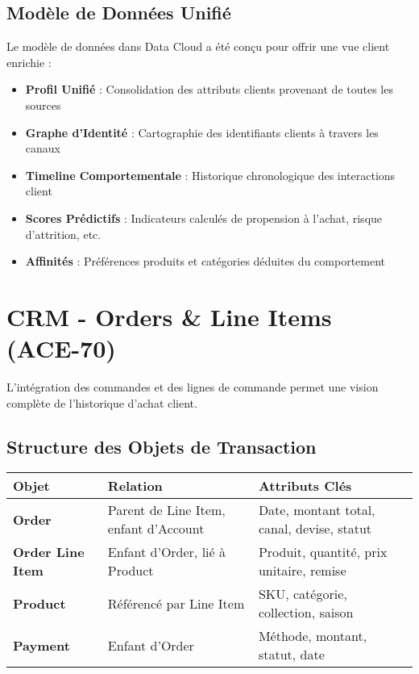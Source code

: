 \subsection{Modèle de Données Unifié}

Le modèle de données dans Data Cloud a été conçu pour offrir une vue client enrichie :

\begin{itemize}
    \item \textbf{Profil Unifié} : Consolidation des attributs clients provenant de toutes les sources
    \item \textbf{Graphe d'Identité} : Cartographie des identifiants clients à travers les canaux
    \item \textbf{Timeline Comportementale} : Historique chronologique des interactions client
    \item \textbf{Scores Prédictifs} : Indicateurs calculés de propension à l'achat, risque d'attrition, etc.
    \item \textbf{Affinités} : Préférences produits et catégories déduites du comportement
\end{itemize}

\section{CRM - Orders \& Line Items (ACE-70)}

L'intégration des commandes et des lignes de commande permet une vision complète de l'historique d'achat client.

\subsection{Structure des Objets de Transaction}

\begin{center}
\begin{tabular}{|>{\bfseries}p{3.5cm}|p{4cm}|p{6cm}|}
\hline
\rowcolor{lightblue} Objet & Relation & Attributs Clés \\
\hline
Order & Parent de Line Item, enfant d'Account & Date, montant total, canal, devise, statut \\
\hline
Order Line Item & Enfant d'Order, lié à Product & Produit, quantité, prix unitaire, remise \\
\hline
Product & Référencé par Line Item & SKU, catégorie, collection, saison \\
\hline
Payment & Enfant d'Order & Méthode, montant, statut, date \\
\hline
\end{tabular}
\end{center}

